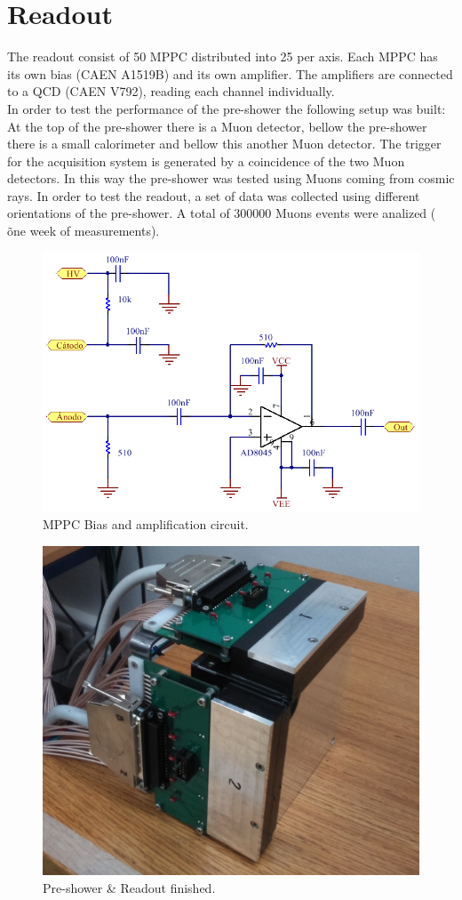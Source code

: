 \documentclass[final,5p,times,twocolumn]{elsarticle}
\begin{document}
\section{Readout}
The readout consist of 50 MPPC distributed into 25 per axis. Each MPPC has its own bias (CAEN A1519B) and its own amplifier. The amplifiers are connected to a QCD (CAEN V792), reading each channel individually.\\
In order to test the performance of the pre-shower the following setup was built:
At the top of the pre-shower there is a Muon detector, bellow the pre-shower there is a small calorimeter and bellow this another Muon detector. The trigger for the acquisition system is generated by a coincidence of the two Muon detectors. In this way the pre-shower was tested using Muons coming from cosmic rays. In order to test the readout, a set of data was collected using different orientations of the pre-shower. A total of 300000 Muons events were analized ( \~ one week of measurements).
\begin{figure}
\includegraphics[width=0.98\linewidth]{ps_bias_amp}
\caption{MPPC Bias and amplification circuit.}
%
\end{figure}
%
\begin{figure}
\includegraphics[width=0.98\columnwidth,keepaspectratio]{ps_ready}
\caption{Pre-shower \& Readout finished.}
\end{figure}
\end{document}
